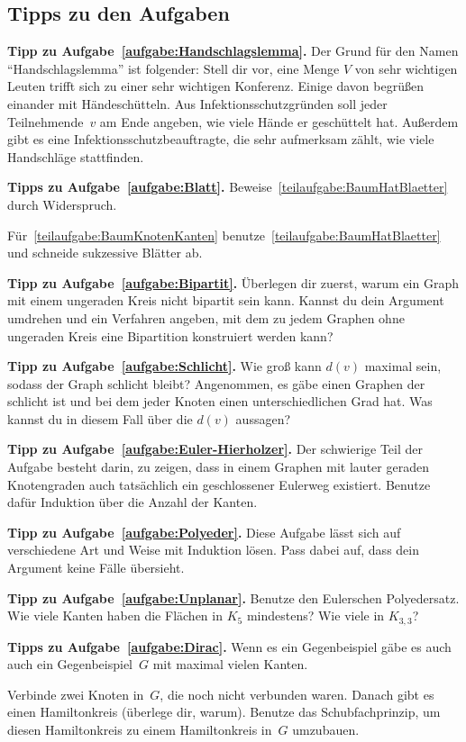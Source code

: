 \subsection*{Tipps zu den Aufgaben}
\textbf{Tipp zu Aufgabe~\ref{aufgabe:Handschlagslemma}.} Der Grund für den Namen \enquote{Handschlagslemma} ist folgender: Stell dir vor, eine Menge $V$ von sehr wichtigen Leuten trifft sich zu einer sehr wichtigen Konferenz. Einige davon begrüßen einander mit Händeschütteln. Aus Infektionsschutzgründen soll jeder Teilnehmende~$v$ am Ende angeben, wie viele Hände er geschüttelt hat. Außerdem gibt es eine Infektionsschutzbeauftragte, die sehr aufmerksam zählt, wie viele Handschläge stattfinden.

\textbf{Tipps zu Aufgabe~\ref{aufgabe:Blatt}.} Beweise~\ref{teilaufgabe:BaumHatBlaetter} durch Widerspruch.

Für~\ref{teilaufgabe:BaumKnotenKanten} benutze~\ref{teilaufgabe:BaumHatBlaetter} und schneide sukzessive Blätter ab.
	
\textbf{Tipp zu Aufgabe~\ref{aufgabe:Bipartit}.} Überlegen dir zuerst, warum ein Graph mit einem ungeraden Kreis nicht bipartit sein kann. Kannst du dein Argument umdrehen und ein Verfahren angeben, mit dem zu jedem Graphen ohne ungeraden Kreis eine Bipartition konstruiert werden kann?

\textbf{Tipp zu Aufgabe~\ref{aufgabe:Schlicht}.}
Wie groß kann $d(v)$ maximal sein, sodass der Graph schlicht bleibt? Angenommen, es gäbe einen Graphen der schlicht ist und bei dem jeder Knoten einen unterschiedlichen Grad hat. Was kannst du in diesem Fall über die $d(v)$ aussagen?

\textbf{Tipp zu Aufgabe~\ref{aufgabe:Euler-Hierholzer}.}
Der schwierige Teil der Aufgabe besteht darin, zu zeigen, dass in einem Graphen mit lauter geraden Knotengraden auch tatsächlich ein geschlossener Eulerweg existiert.  Benutze dafür Induktion über die Anzahl der Kanten.

\textbf{Tipp zu Aufgabe~\ref{aufgabe:Polyeder}.} Diese Aufgabe lässt sich auf verschiedene Art und Weise mit Induktion lösen. Pass dabei auf, dass dein Argument keine Fälle übersieht.

\textbf{Tipp zu Aufgabe~\ref{aufgabe:Unplanar}.} Benutze den Eulerschen Polyedersatz. Wie viele Kanten haben die Flächen in $K_5$ mindestens? Wie viele in $K_{3,3}$?

\textbf{Tipps zu Aufgabe~\ref{aufgabe:Dirac}.} Wenn es ein Gegenbeispiel gäbe es auch auch ein Gegenbeispiel~$G$ mit maximal vielen Kanten.

Verbinde zwei Knoten in~$G$, die noch nicht verbunden waren. Danach gibt es einen Hamiltonkreis (überlege dir, warum). Benutze das Schubfachprinzip, um diesen Hamiltonkreis zu einem Hamiltonkreis in~$G$ umzubauen.


